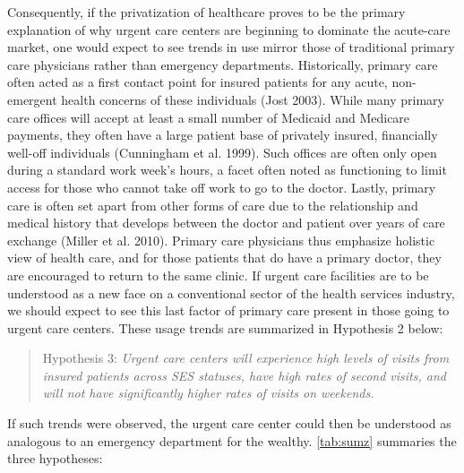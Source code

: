 \documentclass[12pt,twoside]{reedthesis}
\begin{document}
  Consequently, if the privatization of healthcare proves to be the
  primary explanation of why urgent care centers are beginning to dominate
  the acute-care market, one would expect to see trends in use mirror
  those of traditional primary care physicians rather than emergency
  departments. Historically, primary care often acted as a first contact
  point for insured patients for any acute, non-emergent health concerns
  of these individuals (Jost 2003). While many primary care offices will
  accept at least a small number of Medicaid and Medicare payments, they
  often have a large patient base of privately insured, financially
  well-off individuals (Cunningham et al. 1999). Such offices are often
  only open during a standard work week's hours, a facet often noted as
  functioning to limit access for those who cannot take off work to go to
  the doctor. Lastly, primary care is often set apart from other forms of
  care due to the relationship and medical history that develops between
  the doctor and patient over years of care exchange (Miller et al. 2010).
  Primary care physicians thus emphasize holistic view of health care, and
  for those patients that do have a primary doctor, they are encouraged to
  return to the same clinic. If urgent care facilities are to be
  understood as a new face on a conventional sector of the health services
  industry, we should expect to see this last factor of primary care
  present in those going to urgent care centers. These usage trends are
  summarized in Hypothesis 2 below:
  
  \begin{quote}
  Hypothesis 3: \emph{Urgent care centers will experience high levels of
  visits from insured patients across SES statuses, have high rates of
  second visits, and will not have significantly higher rates of visits on
  weekends.}
  \end{quote}
  
  If such trends were observed, the urgent care center could then be
  understood as analogous to an emergency department for the wealthy.
  \autoref{tab:sumz} summaries the three hypotheses:
  
\end{document}

